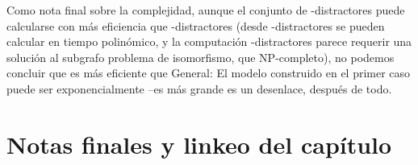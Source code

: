 %


Como nota final sobre la complejidad, aunque el conjunto de \EL-distractores
puede calcularse con más eficiencia que \EPFOL-distractores (desde
\EL-distractores se pueden calcular en tiempo polinómico, y la computación
\EPFOL-distractores parece requerir una solución al subgrafo
problema de isomorfismo, que NP-completo), no podemos concluir que
 es más eficiente que 
General: El modelo construido en el primer caso puede ser exponencialmente
--es más grande es un desenlace, después de todo. %


\section{Notas finales y linkeo del cap\'itulo}
